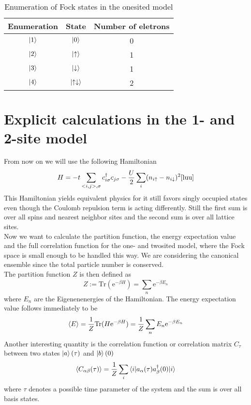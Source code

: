 \newline
\begin{table}[H]
	\centering
	
	\begin{tabular}{ccc}
		
		\hline  
		Enumeration & State & Number of eletrons \\
		\hline
		$\ket{1}$ & $\ket{0}$ & 0\\
		$\ket{2}$ & $\ket{\uparrow}$ & 1\\
		$\ket{3}$ & $\ket{\downarrow}$ & 1\\
		$\ket{4}$ & $\ket{\uparrow\downarrow}$ & 2\\
	\end{tabular}
	\caption{Enumeration of Fock states in the onesited model}
	\label{fock1}
\end{table}
\section{Explicit calculations in the 1- and 2-site model}\label{analytic}
\noindent From now on we will use the following Hamiltonian 
\begin{equation}
H = -t \sum_{<i,j>, \sigma} c_{i\sigma}^\dag c_{j\sigma} - \frac{U}{2} \sum_{i}(n_{i\uparrow} - n_{i\downarrow})^2 
\label{Hnew} \cite{luu}
\end{equation}
This Hamiltonian yields equivalent physics for it still favors singly occupied states even though the Coulomb repulsion term is acting differently. Still the first sum is over all spins and nearest neighbor sites and the second sum is over all lattice sites.\\

Now we want to calculate the partition function, the energy expectation value and the full correlation function for the one- and twosited model, where the Fock space is small enough to be handled this way. We are considering the canonical ensemble since the total particle number is conserved.\\
The partition function $Z$ is then defined as 
\begin{equation}
Z := \text{Tr}(\text{e}^{-\beta H}) = \sum_{n}^{}\text{e}^{-\beta E_n} \label{partition}
\end{equation}
where $E_n$ are the Eigenenenergies of the Hamiltonian. The energy expectation value follows immediately to be
\begin{equation}
\braket{E} = \frac{1}{Z}\text{Tr} (H\text{e}^{-\beta H}) =\frac{1}{Z} \sum_{n}^{} E_n\text{e}^{-\beta E_n} \label{energy}
\end{equation}
Another interesting quantity is the correlation function or correlation matrix $C_{\tau}$ between two states $\ket{a}(\tau)$ and $\ket{b}(0)$
\begin{equation}
	\braket{C_{\alpha\beta}(\tau)}= \frac{1}{Z}\sum_{i}^{}\braket{i|a_{\alpha}(\tau)a^{\dagger}_{\beta}(0)|i}	\label{correlator}
\end{equation}
where $\tau$ denotes a possible time parameter of the system and the sum is over all basis states.
